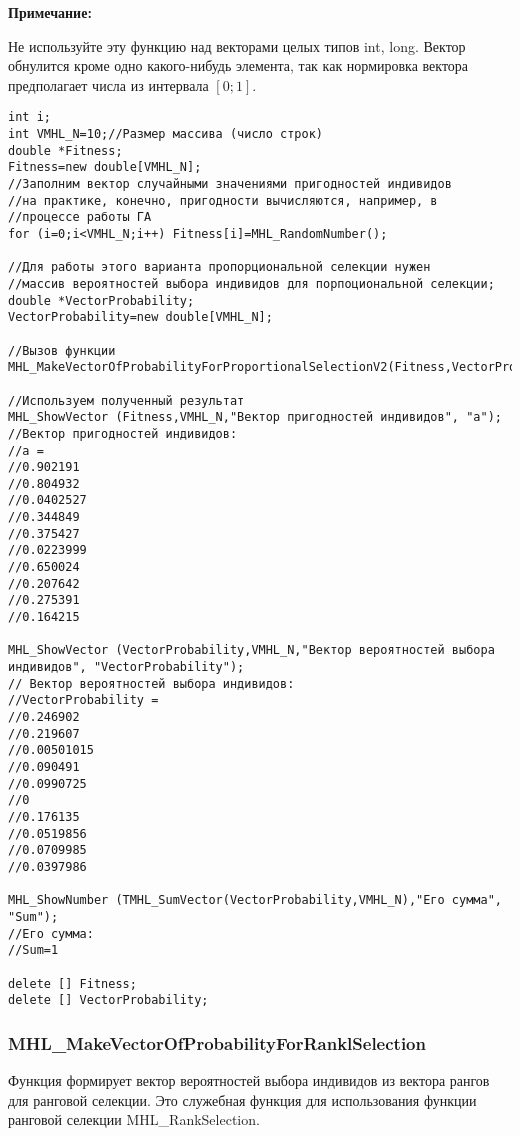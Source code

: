 \documentclass[a4paper,12pt]{article}
\begin{document}
 \textbf{Примечание:} 

Не используйте эту функцию над векторами целых типов int, long. Вектор обнулится кроме одно какого-нибудь элемента, так как нормировка вектора предполагает числа из интервала $[0;1]$.


\begin{lstlisting}[label=code_use_MHL_MakeVectorOfProbabilityForProportionalSelectionV2,caption=Пример использования]
int i;
int VMHL_N=10;//Размер массива (число строк)
double *Fitness;
Fitness=new double[VMHL_N];
//Заполним вектор случайными значениями пригодностей индивидов
//на практике, конечно, пригодности вычисляются, например, в
//процессе работы ГА
for (i=0;i<VMHL_N;i++) Fitness[i]=MHL_RandomNumber();

//Для работы этого варианта пропорциональной селекции нужен
//массив вероятностей выбора индивидов для порпоциональной селекции;
double *VectorProbability;
VectorProbability=new double[VMHL_N];

//Вызов функции
MHL_MakeVectorOfProbabilityForProportionalSelectionV2(Fitness,VectorProbability,VMHL_N);

//Используем полученный результат
MHL_ShowVector (Fitness,VMHL_N,"Вектор пригодностей индивидов", "a");
//Вектор пригодностей индивидов:
//a =	
//0.902191
//0.804932
//0.0402527
//0.344849
//0.375427
//0.0223999
//0.650024
//0.207642
//0.275391
//0.164215

MHL_ShowVector (VectorProbability,VMHL_N,"Вектор вероятностей выбора индивидов", "VectorProbability");
// Вектор вероятностей выбора индивидов:
//VectorProbability =	
//0.246902
//0.219607
//0.00501015
//0.090491
//0.0990725
//0
//0.176135
//0.0519856
//0.0709985
//0.0397986

MHL_ShowNumber (TMHL_SumVector(VectorProbability,VMHL_N),"Его сумма", "Sum");
//Его сумма:
//Sum=1

delete [] Fitness;
delete [] VectorProbability;
\end{lstlisting}

\subsubsection{MHL\_MakeVectorOfProbabilityForRanklSelection}\label{MHL_MakeVectorOfProbabilityForRanklSelection}

Функция формирует вектор вероятностей выбора индивидов из вектора рангов для ранговой селекции. Это служебная функция для использования функции ранговой селекции MHL\_RankSelection.
\end{document}
